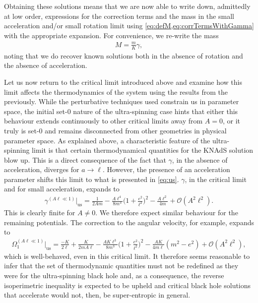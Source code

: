 \documentclass[
twoside,
openright,
frontopenright,
]{dmathesis}
\begin{document}
Obtaining these solutions means that we are now able to write down, admittedly
at low order, expressions for the correction terms and the mass in the small
acceleration and/or small rotation limit using
\cref{eq:defM,eq:corrTermsWithGamma} with the appropriate expansion. For
convenience, we re-write the mass
\begin{align}
M=\frac{m}{K}\gamma,
\end{align}
noting that we do recover known solutions both in the absence of rotation and
the absence of acceleration.

Let us now return to the critical limit introduced above and examine how this
limit affects the thermodynamics of the system using the results from the
previously. While the perturbative techniques used constrain us in parameter
space, the initial set-0 nature of the ultra-spinning case hints that either
this behaviour extends continuously to other critical limits away from $A=0$, or
it truly is set-0 and remains disconnected from other geometries in physical
parameter space. As explained above, a characteristic feature of the
ultra-spinning limit is that certain thermodynamical quantities for the KNAdS
solution blow up. This is a direct consequence of the fact that $\gamma$, in the
absence of acceleration, diverges for $a\to\ell$. However, the presence of an
acceleration parameter shifts this limit to what is presented in
\cref{eq:us}. $\gamma$, in the critical limit and for small acceleration,
expands to
\begin{align}
\gamma^{(A\ell\ll 1)}\Big|_{\mathrm{us}}=\frac{1}{2Am} - \frac{A\ell^4}{8m^3}\Big(1+\frac{e^2}{\ell^2}\Big)^2-\frac{A\ell^2}{4m}+\mathcal{O}(A^2\ell^2).
\end{align}
This is clearly finite for $A\neq 0$. We therefore expect similar behaviour for
the remaining potentials. The correction to the angular velocity, for example,
expands to
\begin{align}
\Omega_1^{(A\ell\ll 1)}\Big|_{\mathrm{us}} = \frac{-K}{2\ell}+\frac{K}{2mA\ell}-\frac{A K\ell^3}{8m^3}\Big(1+\frac{e^2}{\ell^2}\Big)^2-\frac{A K}{4 m\ell}(m^2-e^2)+\mathcal{O}(A^2\ell^2),
\end{align}
which is well-behaved, even in this critical limit. It therefore seems
reasonable to infer that the set of thermodynamic quantities must not be
redefined as they were for the ultra-spinning black hole and, as a consequence,
the reverse isoperimetric inequality is expected to be upheld and critical black
hole solutions that accelerate would not, then, be super-entropic in general.
\end{document}
